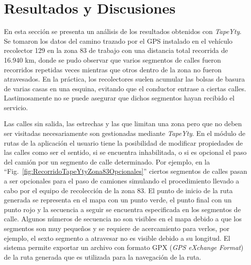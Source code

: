 \documentclass[spanish, conference]{IEEEtran}
\begin{document}
\section{Resultados y Discusiones}

En esta sección se presenta un análisis de los resultados obtenidos con \textit{TapeYty}. Se tomaron los datos del camino trazado por el GPS instalado en el vehículo recolector 129 en la zona 83 de trabajo con una distancia total recorrida de 16.940 km, donde se pudo observar que varios segmentos de calles fueron recorridos repetidas veces mientras que otros dentro de la zona no fueron atravesados. En la práctica, los recolectores suelen acumular las bolsas de basura de varias casas en una esquina, evitando que el conductor entrase a ciertas calles. Lastimosamente no se puede asegurar que dichos segmentos hayan recibido el servicio.

Las calles sin salida, las estrechas y las que limitan una zona pero que no deben ser visitadas necesariamente son gestionadas mediante \textit{TapeYty}. En el módulo de rutas de la aplicación el usuario tiene la posibilidad de modificar propiedades de las calles como ser el sentido, si se encuentra inhabilitada, o si es opcional el paso del camión por un segmento de calle determinado. Por ejemplo, en la ``Fig.~\ref{fig:RecorridoTapeYtyZona83Opcionales}'' ciertos segmentos de calles pasan a ser opcionales para el paso de camiones simulando el procedimiento llevado a cabo por el equipo de recolección de la zona 83. El punto de inicio de la ruta generada se representa en el mapa con un punto verde, el punto final con un punto rojo y la secuencia a seguir se encuentra especificada en los segmentos de calle. Algunos números de secuencia no son visibles en el mapa debido a que los segmentos son muy pequeños y se requiere de acercamiento para verlos, por ejemplo, el sexto segmento a atravesar no es visible debido a su longitud. El sistema permite exportar un archivo con formato GPX (\textit{GPS eXchange Format}) de la ruta generada que es utilizada para la navegación de la ruta.
\end{document}
